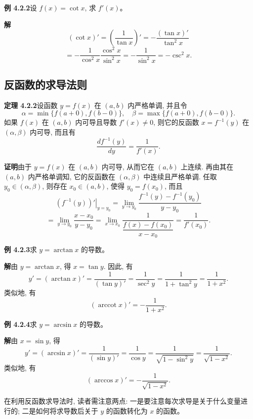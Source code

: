 \documentclass[UTF8,12pt,a4paper,fontset=fandol]{ctexart}
\begin{document}
\noindent\textbf{例 4.2.2}\quad 设 $f(x)=\cot x$, 求 $f'(x)$。

\noindent\textbf{解}\quad
\[
  (\cot x)'=\left(\frac1{\tan x}\right)'
  =
  -\frac{(\tan x)'}{\tan^2 x}
\]
\[
  =
  -\frac1{\cos^2 x}\frac{\cos^2 x}{\sin^2 x}
  =
  -\frac1{\sin^2 x}
  =
  -\operatorname{csc}^2x.
\]

\subsection{反函数的求导法则}

\noindent\textbf{定理 4.2.2}\quad 设函数 $y=f(x)$ 在 $(a,b)$ 内严格单调, 并且令
\[
  \alpha=\min\{f(a+0),f(b-0)\},
  \quad
  \beta=\max\{f(a+0),f(b-0)\}.
\]
如果 $f(x)$ 在 $(a,b)$ 内可导且导数 $f'(x)\ne0$, 则它的反函数 $x=f^{-1}(y)$ 在 $(\alpha,\beta)$ 内可导, 而且有
\[
  \frac{df^{-1}(y)}{dy}=\frac1{f'(x)}.
\]

\noindent\textbf{证明}\quad 由于 $y=f(x)$ 在 $(a,b)$ 内可导, 从而它在 $(a,b)$ 上连续. 再由其在 $(a,b)$ 内严格单调知, 它的反函数在 $(\alpha,\beta)$ 中连续且严格单调. 任取 $y_0\in(\alpha,\beta)$, 则存在 $x_0\in(a,b)$, 使得 $y_0=f(x_0)$, 而且
\[
  \left.(f^{-1}(y))'\right|_{y=y_0}
  =
  \lim_{y\to y_0}\frac{f^{-1}(y)-f^{-1}(y_0)}{y-y_0}
\]
\[
  =
  \lim_{y\to y_0}\frac{x-x_0}{y-y_0}
  =
  \lim_{x\to x_0}
  \frac1{\dfrac{f(x)-f(x_0)}{x-x_0}}
  =
  \frac1{f'(x_0)}.
\]

\noindent\textbf{例 4.2.3}\quad 求 $y=\arctan x$ 的导数。

\noindent\textbf{解}\quad 由 $y=\arctan x$, 得 $x=\tan y$. 因此, 有
\[
  y'=(\arctan x)'=\frac1{(\tan y)'}
  =\frac1{\sec^2 y}
  =\frac1{1+\tan^2 y}
  =\frac1{1+x^2}.
\]
类似地, 有
\[
  (\operatorname{arccot}x)'=-\frac1{1+x^2}.
\]

\noindent\textbf{例 4.2.4}\quad 求 $y=\arcsin x$ 的导数。

\noindent\textbf{解}\quad 由 $x=\sin y$, 得
\[
  y'=(\arcsin x)'=\frac1{(\sin y)'}
  =\frac1{\cos y}
  =\frac1{\sqrt{1-\sin^2y}}
  =\frac1{\sqrt{1-x^2}}.
\]
类似地, 有
\[
  (\arccos x)'=-\frac1{\sqrt{1-x^2}}.
\]

在利用反函数求导法时, 读者需注意两点: 一是要注意每次求导是关于什么变量进行的; 二是如何将求导数后关于 $y$ 的函数转化为 $x$ 的函数。
\end{document}
